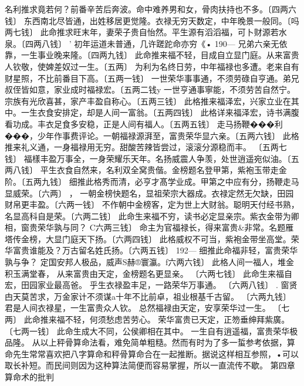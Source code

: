 {{名利推求竟若何？前番辛苦后奔波。命中难养男和女，骨肉扶持也不多。〔四两六钱〕
东西南北尽皆通，出姓移居更觉隆。衣禄无穷天数定，中年晚景一般同。〔吗两七钱〕
此命推求旺末年，妻荣子贵自怡然。平生源有滔滔福，可卜财源若水泉。〔四两八钱〕	'
初年运道未普通，几许蹉跎命亦穷《•
190—
兄弟六亲无依靠，一生事业晚来隆。〔四两九钱〕
此命推来福不轻，目成自立显门庭。从来富贵人钦敬，使婢差奴过一生。〔五两〕
为利为名终日劳，中年福禄也多遭。老来自有财星照，不比前番目下高。〔五两一钱〕
一世荣华事事通，不须劳碌自亨通。弟兄叔侄皆如意，家业成时福禄宏。〔五两二钱y
一世亨通事寧能，不须劳苦自然宁。宗族有光欣喜甚，家产丰盈自称心。〔五两三钱〕
此格推来福泽宏，兴家立业在其中。一生衣食安排定，却是人间一富翁。〔五两四钱〕
此格详来福泽宏，诗书满腹看功成。丰衣足食多安稳，正是人间有福人。〔五两五钱〕
走马扬鞭���利���，少年作事费评论。一朝福禄源湃至，富贵荣华显六亲。〔五两六钱〕
此格推来礼义通，一身福禄用无穷。甜酸苦辣皆尝过，滚滚分源稳而丰。
〔五两七钱〕
福樣丰盈万事全，一身荣耀乐天年。名扬威震人争羡，处世逍遥宛似油。〔五两八钱〕
平生衣食自然来，名利双全窝贵偕。金榜题名登甲第，紫袍玉带走金阶。〔五两九钱〕
细推此格秀而清，必亨才髙学业成。甲第之中应有分，扬鞭走马显威荣。〔六两〕	，
一朝金榜快题名，显祖荣宗大器成。衣禄定然无欠缺，田园财帛更丰盈。〔六两一钱〕
不作朝中金榜客，定为世上大财翁。聪明天付经书熟，名显高科自是荣。〔六两二钱〕
此命生来福不穷，读书必定显亲宗。紫衣金带为卿相，窗贵荣华孰与同？
C六两三钱〕
命主为官福禄长，得来富贵&非常。名题雁塔传金榜，大显门庭天下扬。〔六两四钱〕
此格威权不可当，紫袍金带坐高堂。荣华富贵谁能及？万古留名姓氏扬。〔六两五钱〕
192—
细推此命福非轻，富贵荣华孰与争？
定国安邦人极品，威声S赫®寰瀛。f六两六钱〕
此格人间一福人，堆金积玉满堂春，
从来富贵由天定，金榜题名更显亲。
〔六两七钱〕
此命生来福自宏，田园家业最高爸。
乎生衣禄盈丰足，一路荣华万事通。
〔六两八钱〕	.
窗贤甴天莫苦求，万金家计不须谋a十年不比前卓，祖业根基千古留。
〔六两九钱〕
君是人间衣禄星，一生富贵众人钦。
总然福禄由天定，安享荣华过一生。
〔七两〕
此命推来福不轻，何须愁虑苦劳心。
荣华富贵已天定，正笏垂绅拜紫廣。
〔七两一钱〕
此命生成大不同，公侯卿相在其中。
一生自有逍遥福，富贵荣华极品隆。
从以上秤骨算命法看，难免简单粗糙。然而有时为了多一蜇参考依据，算命先生常常喜欢把八字算命和秤骨算命合在一起推断。据说这样相互参照，•可以取长补短。而民间则因为这种算法简便而容易掌握，所以一直流传不歇。
第四章算命术的批判

}}
